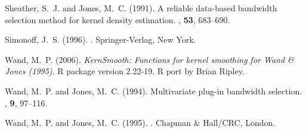 \documentclass[a4paper,11pt]{article}
\begin{document}
\begin{thebibliography}{xx}
Sheather, S.~J. and Jones, M.~C. (1991).
\newblock A reliable data-based bandwidth selection method for kernel density
  estimation.
, \textbf{53}, 683--690.

Simonoff, J.~S. (1996).
.
\newblock Springer-Verlag, New York.

Wand, M.~P. (2006).
\newblock \emph{KernSmooth: Functions for kernel smoothing for Wand \& Jones
  (1995)}.
\newblock R package version 2.22-19. R port by Brian Ripley.

Wand, M.~P. and Jones, M.~C. (1994).
\newblock Multivariate plug-in bandwidth selection.
, \textbf{9}, 97--116.

Wand, M.~P. and Jones, M.~C. (1995).
.
\newblock Chapman \& Hall/CRC, London.

\end{thebibliography}
\end{document}
